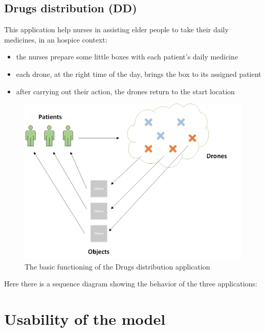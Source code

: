 \newpage

\subsection{Drugs distribution (DD)}\label{dd}

This application help nurses in assisting elder people to take their daily medicines, in an hospice context:

\begin{itemize}
\itemsep2pt
\item{
the nurses prepare some little boxes with each patient’s daily medicine
}
\item{
each drone, at the right time of the day, brings the box to its assigned patient
}
\item{
after carrying out their action, the drones return to the start location
}

\end{itemize}


\begin{figure}[H]
  \centering
  \includegraphics[width=\linewidth]{pictures/DD.png}
  \caption{The basic functioning of the Drugs distribution application}
  \label{fig:DD}
\end{figure}

Here there is a sequence diagram showing the behavior of the three applications:


\newpage

\section{Usability of the model}
\label{usability}


